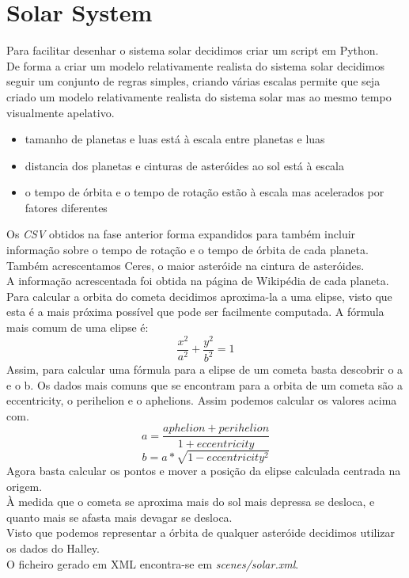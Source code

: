 \documentclass[a4paper]{report}
\begin{document}
\section{Solar System}
Para facilitar desenhar o sistema solar decidimos criar um script em Python.\\
De forma a criar um modelo relativamente realista do sistema solar decidimos
seguir um conjunto de regras simples, criando várias escalas permite que seja
criado um modelo relativamente realista do sistema solar mas ao mesmo tempo
visualmente apelativo.\\

\begin{itemize}
        \item tamanho de planetas e luas está à escala entre planetas e luas
        \item distancia dos planetas e cinturas de asteróides ao sol está à
            escala
        \item o tempo de órbita e o tempo de rotação estão à escala mas
            acelerados por fatores diferentes
\end{itemize}
Os \textit{CSV} obtidos na fase anterior forma expandidos para também incluir
informação sobre o tempo de rotação e o tempo de órbita de cada planeta. Também
acrescentamos Ceres, o maior asteróide na cintura de asteróides.\\
A informação acrescentada foi obtida na página de Wikipédia de cada planeta.\\
Para calcular a orbita do cometa decidimos aproxima-la a uma elipse, visto que
esta é a mais próxima possível que pode ser facilmente computada. A fórmula mais
comum de uma elipse é:
\[ \frac{x^2}{a^2} + \frac{y^2}{b^2} = 1 \]
Assim, para calcular uma fórmula para a elipse de um cometa basta descobrir o a
e o b. Os dados mais comuns que se encontram para a orbita de um cometa são a
eccentricity, o perihelion e o aphelions. Assim podemos calcular os valores
acima com.
\[ a = \frac{aphelion + perihelion}{1 + eccentricity} \]
\[ b = a * \sqrt{1 - eccentricity^2} \]
Agora basta calcular os pontos e mover a posição da elipse calculada centrada na
origem.\\
À medida que o cometa se aproxima mais do sol mais depressa se desloca, e quanto
mais se afasta mais devagar se desloca.\\
Visto que podemos representar a órbita de qualquer asteróide decidimos utilizar
os dados do Halley.\\
O ficheiro gerado em XML encontra-se em \textit{scenes/solar.xml}.
\end{document}
